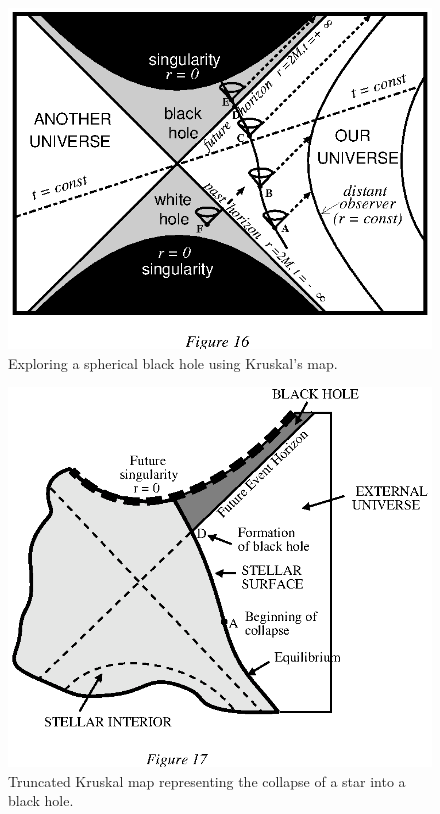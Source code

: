 \documentclass[12pt]{article}
\begin{document}
\begin{figure}[tb]
  \begin{center}
    \leavevmode
    \includegraphics{kruskal.ps}    
    \caption{Exploring a spherical black hole using Kruskal's map.}
  \end{center}
\end{figure}
\begin{figure}[tb]
  \begin{center}
    \leavevmode
    \includegraphics{kruskalB.ps}    
    \caption{Truncated Kruskal map representing the collapse of a star
      into a black hole.}
  \end{center}
\end{figure}
\end{document}
